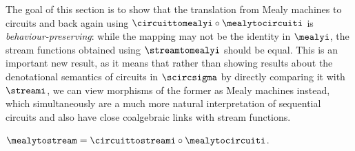 The goal of this section is to show that the translation from Mealy machines to
circuits and back again using \(\circuittomealyi \circ \mealytocircuiti\) is
\emph{behaviour-preserving}: while the mapping may not be the identity in
\(\mealyi\), the stream functions obtained using \(\streamtomealyi\) should
be equal.
This is an important new result, as it means that rather than showing
results about the denotational semantics of circuits in \(\scircsigma\) by
directly comparing it with \(\streami\), we can view morphisms of the former as
Mealy machines instead, which simultaneously are a much more natural
interpretation of sequential circuits and also have close coalgebraic links with
stream functions.

\begin{theorem}\label{thm:mealy-to-circuit}
    \(
    \mealytostream = \circuittostreami \circ \mealytocircuiti
    \).
\end{theorem}
